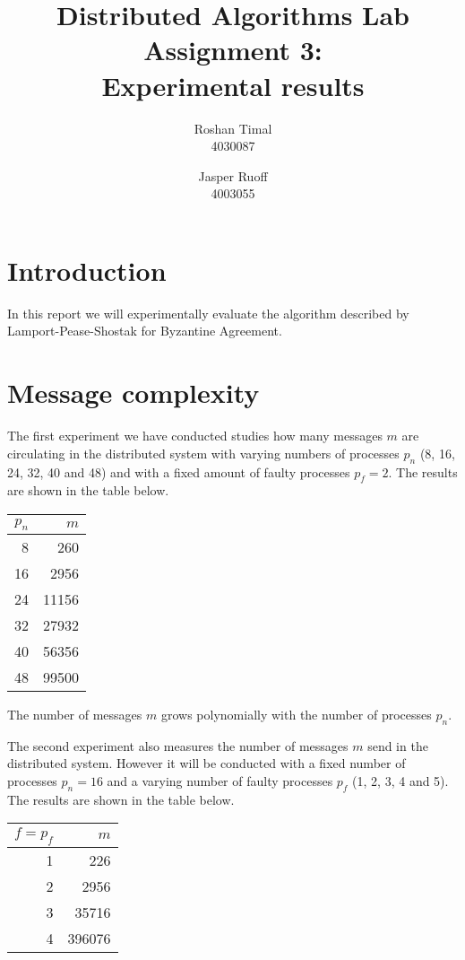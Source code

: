\documentclass[a4paper,12pt]{article}
\title{Distributed Algorithms Lab Assignment 3: \\ Experimental results}
\author{Roshan Timal \\ 4030087 \and Jasper Ruoff \\ 4003055}
\begin{document}
\maketitle

\section*{Introduction}
In this report we will experimentally evaluate the algorithm described by Lamport-Pease-Shostak for Byzantine Agreement.

\section{Message complexity}
The first experiment we have conducted studies how many messages $m$ are circulating in the distributed system with varying numbers of processes $p_n$ (8, 16, 24, 32, 40 and 48) and with a fixed amount of faulty processes $p_f = 2$. The results are shown in the table below.


\begin{table}[!ht]
	\centering
	\begin{tabular}{r|r}
		$p_n$ & $m$ \\ \hline
		8 & 260 \\
		16 & 2956 \\
		24 & 11156 \\
		32 & 27932 \\
		40 & 56356 \\
		48 & 99500
	\end{tabular}
\end{table}

The number of messages $m$ grows polynomially with the number of processes $p_n$.

The second experiment also measures the number of messages $m$ send in the distributed system. However it will be conducted with a fixed number of processes $p_n = 16$ and a varying number of faulty processes $p_f$ (1, 2, 3, 4 and 5). The results are shown in the table below.


\begin{table}[!ht]
	\centering
	\begin{tabular}{r|r}
		$f = p_f$ & $m$ \\ \hline
		1 & 226 \\
		2 & 2956 \\
		3 & 35716 \\
		4 & 396076
	\end{tabular}
\end{table}
\end{document}

